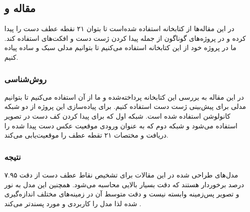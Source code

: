 \subsection{مقاله  و }
در این مقاله‌ها از کتابخانه  استفاده‌ شده‌است تا بتوان ۲۱ نقطه عطف دست را پیدا کرده و در پروژه‌های گوناگون از جمله پیدا کردن ژست دست و افکت‌های  استفاده کند. ما در پروژه خود از این کتابخانه استفاده می‌کنیم تا بتوانیم مدلی سبک و ساده پیاده کنیم.

\subsubsection{روش‌شناسی}
 در این مقاله به یررسی این کتابخانه پرداخته‌شده و ما از آن استفاده می‌کنیم تا بتوانیم مدلی برای پیش‌بینی ژست دست استفاده کنیم.
برای پیاده‌سازی این پروژه از دو شبکه کانولوشن استفاده شده است. شبکه اول که برای پیدا کردن کف دست در تصویر استفاده می‌شود و شبکه دوم که به عنوان ورودی موقعیت عکس دست پیدا شده را دریافت و مختصات ۲۱ تقطه عطف را موقعیت‌یابی می‌کند.






\subsubsection{نتیجه}
مدل‌های طراحی شده در این مقالات برای تشخیص نقاط عطف دست از دقت ۷.۹۵ درصد برخوردار هستند که دقت بسیار بالایی محاسبه می‌شود. همچنین این مدل به نور و تصویر پس‌زمینه وابسته نیست و دقت متوسط آن در زمینه‌های مختلف اندازه‌گیری شده لذا مدل را کاربردی‌ و مورد پسندتر می‌کند\cite{zhang2020mediapipe} \cite{harris2021applying}.



